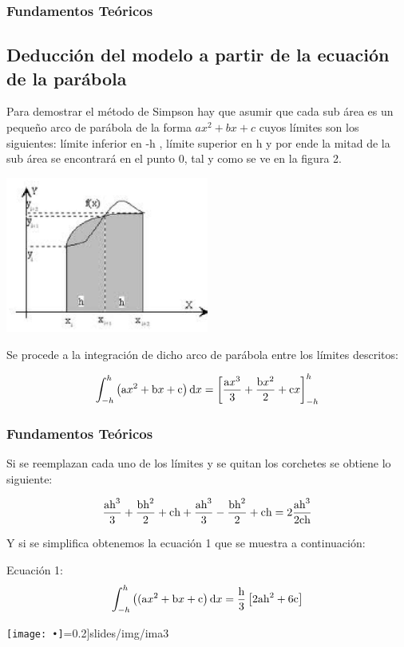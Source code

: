 \documentclass{beamer}
\begin{document}
\begin{frame}
\frametitle{Fundamentos Teóricos}
\subsection{Deducción del modelo a partir de la ecuación de la parábola}
Para demostrar el método de Simpson hay que asumir que cada sub área es un pequeño arco de parábola de la forma $ ax^2 + bx + c $ cuyos límites son los siguientes: límite inferior en -h , límite superior en h y por ende la mitad de la sub área se encontrará en el punto 0, tal y como se ve en la figura 2.
	
\begin{center}
\includegraphics[width=0.5\textwidth]{slides/img/ima2}
\end{center}	
	
		Se procede a la integración de dicho arco de parábola entre los límites descritos:
		
		\[ \int_{-h}^{h}\left(\textup{a}x^2 + \textup{b}x + \textup{c}\right)\textup{d}x=\left[\frac{\textup{a}x^{3}}
		{3}+\frac{\textup{b}x^{2}}{2}+\textup{c}x\right]_{-h}^{h} \] 
		
\end{frame}

\begin{frame}
\frametitle{Fundamentos Teóricos}	
		Si se reemplazan cada uno de los límites y se quitan los corchetes se obtiene lo siguiente:
		
		\[\frac{\textup{a}\textup{h}^3}{3} + \frac{\textup{b}\textup{h}^2}{2} + \textup{c}\textup{h} + \frac{\textup{a}\textup{h}^3}{3} 
		-  \frac{\textup{b}\textup{h}^2}{2} + \textup{c}\textup{h}=2\frac{\textup{a}\textup{h}^3}{2\textup{c}\textup{h}}\]
		
		Y si se simplifica obtenemos la ecuación 1 que se muestra a continuación:
		
		Ecuación 1: \[\int_{-h}^{h}\left((\textup{a}x^2 + \textup{b}x + \textup{c}\right)\textup{d}x=\frac{\textup{h}}
		{3}\left[2\textup{a}\textup{h}^2  +  6\textup{c}\right]\]
		
\begin{center}
\texttt{[image: •]}=0.2\textwidth]{slides/img/ima3}
\end{center}
	
\end{frame}
\end{document}
